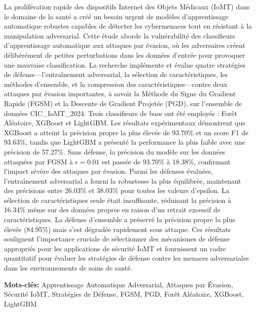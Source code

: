 \documentclass[12pt,a4paper,oneside]{report}
\begin{document}
La prolif\'eration rapide des dispositifs Internet des Objets M\'edicaux (IoMT) dans le domaine de la sant\'e a cr\'e\'e un besoin urgent de mod\`eles d'apprentissage automatique robustes capables de d\'etecter les cybermenaces tout en r\'esistant \`a la manipulation adversarial. Cette \'etude aborde la vuln\'erabilit\'e des classifieurs d'apprentissage automatique aux attaques par \'evasion, o\`u les adversaires cr\'eent d\'elib\'er\'ement de petites perturbations dans les donn\'ees d'entr\'ee pour provoquer une mauvaise classification. La recherche impl\'emente et \'evalue quatre strat\'egies de d\'efense---l'entra\^inement adversarial, la s\'election de caract\'eristiques, les m\'ethodes d'ensemble, et la compression des caract\'eristiques---contre deux attaques par \'evasion importantes, \`a savoir la M\'ethode du Signe du Gradient Rapide (FGSM) et la Descente de Gradient Projet\'ee (PGD), sur l'ensemble de donn\'ees CIC\_IoMT\_2024. Trois classifieurs de base ont \'et\'e employ\'es : For\^et Al\'eatoire, XGBoost et LightGBM. Les r\'esultats exp\'erimentaux d\'emontrent que XGBoost a atteint la pr\'ecision propre la plus \'elev\'ee de 93.70\% et un score F1 de 93.63\%, tandis que LightGBM a pr\'esent\'e la performance la plus faible avec une pr\'ecision de 57.27\%. Sans d\'efense, la pr\'ecision du mod\`ele sur les donn\'ees attaqu\'ees par FGSM \`a $\epsilon = 0.01$ est pass\'ee de 93.70\% \`a 18.38\%, confirmant l'impact s\'ev\`ere des attaques par \'evasion. Parmi les d\'efenses \'evalu\'ees, l'entra\^inement adversarial a fourni la robustesse la plus \'equilibr\'ee, maintenant des pr\'ecisions entre 26.03\% et 38.03\% pour toutes les valeurs d'epsilon. La s\'election de caract\'eristiques seule \'etait insuffisante, r\'eduisant la pr\'ecision \`a 16.34\% m\^eme sur des donn\'ees propres en raison d'un retrait excessif de caract\'eristiques. La d\'efense d'ensemble a pr\'eserv\'e la pr\'ecision propre la plus \'elev\'ee (84.95\%) mais s'est d\'egrad\'ee rapidement sous attaque. Ces r\'esultats soulignent l'importance cruciale de s\'electionner des m\'ecanismes de d\'efense appropri\'es pour les applications de s\'ecurit\'e IoMT et fournissent un cadre quantitatif pour \'evaluer les strat\'egies de d\'efense contre les menaces adversariales dans les environnements de soins de sant\'e.

\vspace{0.5cm}
\noindent\textbf{Mots-cl\'es:} Apprentissage Automatique Adversarial, Attaques par \'Evasion, S\'ecurit\'e IoMT, Strat\'egies de D\'efense, FGSM, PGD, For\^et Al\'eatoire, XGBoost, LightGBM
\newpage
\end{document}
